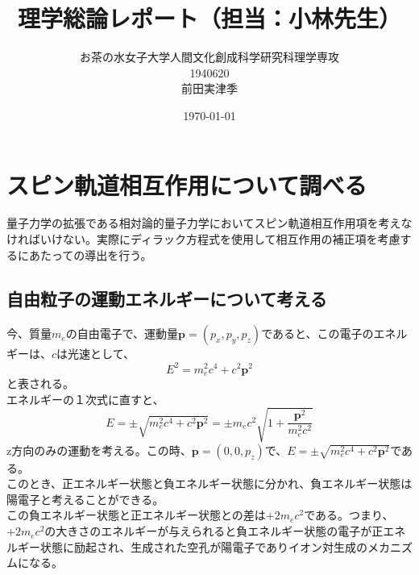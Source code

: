 \documentclass[10pt]{jreport}
\begin{document}
\title{理学総論レポート（担当：小林先生）}

\author{お茶の水女子大学人間文化創成科学研究科理学専攻 \\1940620 \\ 前田実津季}
\date{\today}
\maketitle

\section*{スピン軌道相互作用について調べる}
量子力学の拡張である相対論的量子力学においてスピン軌道相互作用項を考えなければいけない。実際にディラック方程式を使用して相互作用の補正項を考慮するにあたっての導出を行う。\\
\subsection*{自由粒子の運動エネルギーについて考える}
今、質量$m_e$の自由電子で、運動量$\textbf{p}=(p_x,p_y,p_z)$であると、この電子のエネルギーは、$c$は光速として、
\begin{equation}
E^2=m_e^2c^4+c^2\textbf{p}^2
\end{equation}
と表される。\\
エネルギーの１次式に直すと、\\
\begin{equation}
E=\pm\sqrt{m_e^2c^4+c^2\textbf{p}^2}=\pm m_ec^2\sqrt{1+\frac{\textbf{p}^2}{m_e^2c^2}}
\end{equation}
z方向のみの運動を考える。この時、$\textbf{p}=(0,0,p_z)$で、$E=\pm\sqrt{m_e^2c^4+c^2\textbf{p}^2}$である。\\
このとき、正エネルギー状態と負エネルギー状態に分かれ、負エネルギー状態は陽電子と考えることができる。\\
この負エネルギー状態と正エネルギー状態との差は$+2m_e c^2$である。つまり、$+2m_e c^2$の大きさのエネルギーが与えられると負エネルギー状態の電子が正エネルギー状態に励起され、生成された空孔が陽電子でありイオン対生成のメカニズムになる。
\end{document}
